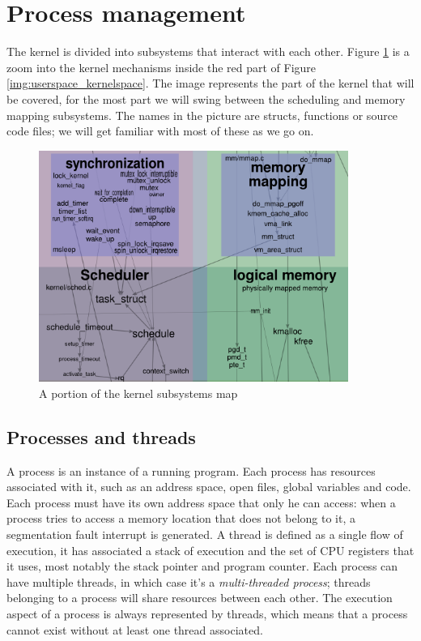 \section{Process management}
The kernel is divided into subsystems that interact with each other. Figure \ref{img:kernelmap} is a zoom into the kernel mechanisms inside the red part of Figure \ref{img:userspace_kernelspace}. The image represents the part of the kernel that will be covered, for the most part we will swing between the scheduling and memory mapping subsystems. The names in the picture are structs, functions or source code files; we will get familiar with most of these as we go on.

\begin{figure}[t]
\centering
\includegraphics[width=0.9\textwidth]{images/kernelmap.png}
\caption{A portion of the kernel subsystems map}
\label{img:kernelmap}
\end{figure}

\subsection{Processes and threads}
\label{sec:proc_threads}
A process is an instance of a running program. Each process has resources associated with it, such as an address space, open files, global variables and code. Each process must have its own address space that only he can access: when a process tries to access a memory location that does not belong to it, a segmentation fault interrupt is generated. A thread is defined as a single flow of execution, it has associated a stack of execution and the set of CPU registers that it uses, most notably the stack pointer and program counter. Each process can have multiple threads, in which case it's a \textit{multi-threaded process}; threads belonging to a process will share resources between each other. The execution aspect of a process is always represented by threads, which means that a process cannot exist without at least one thread associated.

